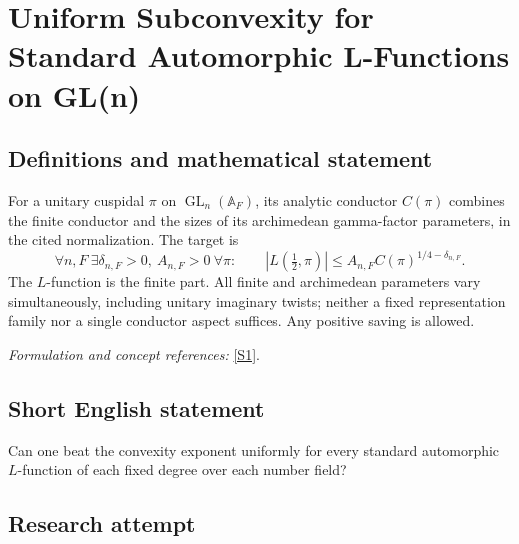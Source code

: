 \documentclass[11pt,a4paper]{article}
\newcommand{\A}{\mathbb{A}}
\newcommand{\sref}[2]{\hyperlink{source:#1:#2}{[S#2]}}
\newif\ifshowcatalogue
\newcommand{\cataloguescope}[1]{\ifshowcatalogue
 \paragraph{Exact scope in the supplied catalogue.}
 \begin{quote}\small #1\end{quote}\fi}
\numberwithin{equation}{section}
\begin{document}
\setcounter{section}{0}
\clearpage
\section*{\texorpdfstring{Uniform Subconvexity for Standard Automorphic L-Functions on GL(n)}{Uniform Subconvexity for Standard Automorphic L-Functions on GL(n)}}\label{30006752}
\subsection{Definitions and mathematical statement}
For a unitary cuspidal $\pi$ on $\operatorname{GL}_n(\A_F)$, its analytic conductor $C(\pi)$ combines the finite conductor and the sizes of its archimedean gamma-factor parameters, in the cited normalization. The target is
\[
 \forall n,F\ \exists\delta_{n,F}>0,\ A_{n,F}>0\ \forall\pi:\qquad
 |L(\tfrac12,\pi)|\le A_{n,F}C(\pi)^{1/4-\delta_{n,F}}.
\]
The $L$-function is the finite part. All finite and archimedean parameters vary simultaneously, including unitary imaginary twists; neither a fixed representation family nor a single conductor aspect suffices. Any positive saving is allowed.
\par\smallskip\textit{Formulation and concept references:} \sref{30006752}{1}.
\cataloguescope{For every integer n\ensuremath{\ge}1 and every number field F, there exist constants \ensuremath{\delta}(n,F)>0 and A(n,F)>0 such that |L(1/2,\ensuremath{\pi})|\ensuremath{\le}A(n,F) C(\ensuremath{\pi})\textasciicircum{}(1/4\ensuremath{-}\ensuremath{\delta}(n,F)) for every unitary cuspidal automorphic representation \ensuremath{\pi} of GL\_n(A\_F), where L(s,\ensuremath{\pi}) is the standard finite-part L-function and C(\ensuremath{\pi}) its analytic conductor. The bound must be uniform simultaneously in all finite and archimedean parameters of \ensuremath{\pi}; imaginary unitary twists are included. Any fixed positive exponent saving suffices; the optimal exponent is not requested.}
\subsection{Short English statement}
Can one beat the convexity exponent uniformly for every standard automorphic $L$-function of each fixed degree over each number field?
\subsection{Research attempt}
\end{document}
